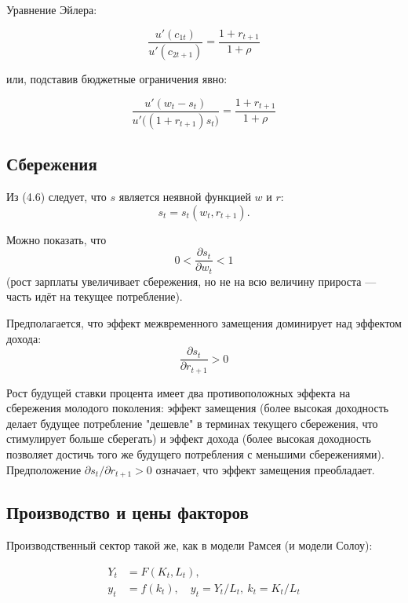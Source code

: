 \documentclass[10pt,a4paper]{article}
\begin{document}
Уравнение Эйлера:
\begin{formulabox}
\begin{equation}
\frac{u'(c_{1t})}{u'(c_{2t+1})} = \frac{1+r_{t+1}}{1+\rho} \tag{4.5}
\end{equation}
\end{formulabox}
или, подставив бюджетные ограничения явно:
\begin{formulabox}
\begin{equation}
\frac{u'(w_t - s_t)}{u'\big((1+r_{t+1})s_t\big)} = \frac{1+r_{t+1}}{1+\rho} \tag{4.6}
\end{equation}
\end{formulabox}

\subsection{Сбережения}

Из (4.6) следует, что $s$ является неявной функцией $w$ и $r$:
$$s_t = s_t(w_t, r_{t+1}).$$

Можно показать, что
$$0 < \frac{\partial s_t}{\partial w_t} < 1$$
(рост зарплаты увеличивает сбережения, но не на всю величину прироста — часть идёт на текущее потребление).

Предполагается, что эффект межвременного замещения доминирует над эффектом дохода:
$$\frac{\partial s_t}{\partial r_{t+1}} > 0$$

\begin{intuition}
Рост будущей ставки процента имеет два противоположных эффекта на сбережения молодого поколения: эффект замещения (более высокая доходность делает будущее потребление "дешевле" в терминах текущего сбережения, что стимулирует больше сберегать) и эффект дохода (более высокая доходность позволяет достичь того же будущего потребления с меньшими сбережениями). Предположение $\partial s_t/\partial r_{t+1}>0$ означает, что эффект замещения преобладает.
\end{intuition}

\subsection{Производство и цены факторов}

Производственный сектор такой же, как в модели Рамсея (и модели Солоу):
\begin{formulabox}
\begin{align}
Y_t &= F(K_t, L_t), \tag{4.7}\\
y_t &= f(k_t), \quad y_t = Y_t/L_t,\ k_t = K_t/L_t \tag{4.8}
\end{align}
\end{formulabox}
\end{document}
